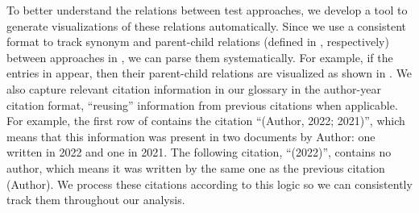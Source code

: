 To better understand the relations between test approaches, we develop a tool
to generate visualizations of these relations automatically.
\ifnotpaper
    Since we use a consistent format to track synonym and parent-child
    relations (defined in , respectively)
    between approaches in \ourApproachGlossary{}, we can parse them
    systematically. For example, if the entries in 
    appear, then their parent-child relations are visualized as
    shown in . We also capture relevant
    citation information in our glossary in the author-year citation format,
    ``reusing'' information from previous citations when applicable.
    For example, the first row of 
    contains the citation ``(Author, 2022; 2021)'', which means that this
    information was present in two documents by Author: one written in
    2022 and one in 2021. The following citation, ``(2022)'',
    contains no author, which means it was written by the same one as the
    previous citation (Author). We process these citations according to this
    logic  so we can
    consistently track them throughout our analysis.

